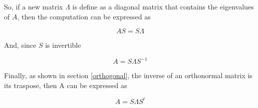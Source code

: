 \documentclass[12pt,journal]{IEEEtran}
\begin{document}
    So, if a new matrix $\Lambda$ is define as a diagonal matrix that contains
    the eigenvalues of $A$, then the computation can be expressed as

    \begin{equation*}
        A S = S \Lambda
    \end{equation*}

    And, since $S$ is invertible

    \begin{equation*}
        A = S \Lambda S^{-1}
    \end{equation*}

    Finally, as shown in section \ref{orthogonal}, the inverse of an orthonormal
    matrix is its traspose, then A can be expressed as

    \begin{equation*}
        A = S \Lambda S^t
    \end{equation*}



\end{document}
